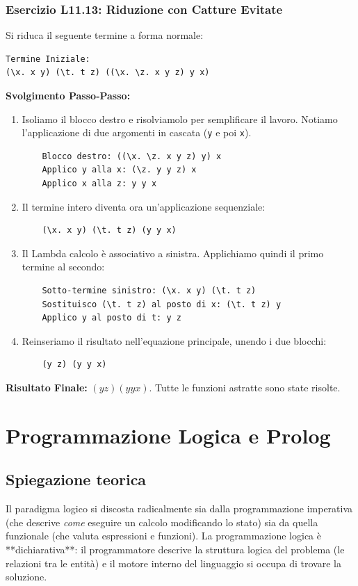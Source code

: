 \documentclass[12pt, a4paper]{article}
\begin{document}
\subsubsection{Esercizio L11.13: Riduzione con Catture Evitate}
Si riduca il seguente termine a forma normale:
\begin{verbatim}
Termine Iniziale:
(\x. x y) (\t. t z) ((\x. \z. x y z) y x)
\end{verbatim}

\textbf{Svolgimento Passo-Passo:}
\begin{enumerate}
    \item Isoliamo il blocco destro e risolviamolo per semplificare il lavoro. Notiamo l'applicazione di due argomenti in cascata (\texttt{y} e poi \texttt{x}).
    \begin{verbatim}
    Blocco destro: ((\x. \z. x y z) y) x
    Applico y alla x: (\z. y y z) x
    Applico x alla z: y y x
    \end{verbatim}
    \item Il termine intero diventa ora un'applicazione sequenziale:
    \begin{verbatim}
    (\x. x y) (\t. t z) (y y x)
    \end{verbatim}
    \item Il Lambda calcolo è associativo a sinistra. Applichiamo quindi il primo termine al secondo:
    \begin{verbatim}
    Sotto-termine sinistro: (\x. x y) (\t. t z)
    Sostituisco (\t. t z) al posto di x: (\t. t z) y
    Applico y al posto di t: y z
    \end{verbatim}
    \item Reinseriamo il risultato nell'equazione principale, unendo i due blocchi:
    \begin{verbatim}
    (y z) (y y x)
    \end{verbatim}
\end{enumerate}
\textbf{Risultato Finale:} $(y z) (y y x)$. Tutte le funzioni astratte sono state risolte.

\section{Programmazione Logica e Prolog}

\subsection{Spiegazione teorica}
Il paradigma logico si discosta radicalmente sia dalla programmazione imperativa (che descrive \textit{come} eseguire un calcolo modificando lo stato) sia da quella funzionale (che valuta espressioni e funzioni). La programmazione logica è **dichiarativa**: il programmatore descrive la struttura logica del problema (le relazioni tra le entità) e il motore interno del linguaggio si occupa di trovare la soluzione.
\end{document}
